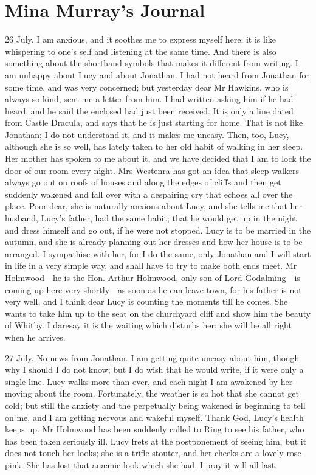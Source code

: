 \section{Mina Murray's Journal}

\begin{diary}{26 July.}
I am anxious, and it soothes me to express myself here; it is like whispering to one's self and listening at the same time. And there is also something about the shorthand symbols that makes it different from writing. I am unhappy about Lucy and about Jonathan. I had not heard from Jonathan for some time, and was very concerned; but yesterday dear Mr Hawkins, who is always so kind, sent me a letter from him. I had written asking him if he had heard, and he said the enclosed had just been received. It is only a line dated from Castle Dracula, and says that he is just starting for home. That is not like Jonathan; I do not understand it, and it makes me uneasy. Then, too, Lucy, although she is so well, has lately taken to her old habit of walking in her sleep. Her mother has spoken to me about it, and we have decided that I am to lock the door of our room every night. Mrs Westenra has got an idea that sleep-walkers always go out on roofs of houses and along the edges of cliffs and then get suddenly wakened and fall over with a despairing cry that echoes all over the place. Poor dear, she is naturally anxious about Lucy, and she tells me that her husband, Lucy's father, had the same habit; that he would get up in the night and dress himself and go out, if he were not stopped. Lucy is to be married in the autumn, and she is already planning out her dresses and how her house is to be arranged. I sympathise with her, for I do the same, only Jonathan and I will start in life in a very simple way, and shall have to try to make both ends meet. Mr Holmwood—he is the Hon. Arthur Holmwood, only son of Lord Godalming—is coming up here very shortly—as soon as he can leave town, for his father is not very well, and I think dear Lucy is counting the moments till he comes. She wants to take him up to the seat on the churchyard cliff and show him the beauty of Whitby. I daresay it is the waiting which disturbs her; she will be all right when he arrives.
\end{diary}
 
\begin{diary}{27 July.}
No news from Jonathan. I am getting quite uneasy about him, though why I should I do not know; but I do wish that he would write, if it were only a single line. Lucy walks more than ever, and each night I am awakened by her moving about the room. Fortunately, the weather is so hot that she cannot get cold; but still the anxiety and the perpetually being wakened is beginning to tell on me, and I am getting nervous and wakeful myself. Thank God, Lucy's health keeps up. Mr Holmwood has been suddenly called to Ring to see his father, who has been taken seriously ill. Lucy frets at the postponement of seeing him, but it does not touch her looks; she is a trifle stouter, and her cheeks are a lovely rose-pink. She has lost that anæmic look which she had. I pray it will all last.
\end{diary}
 
